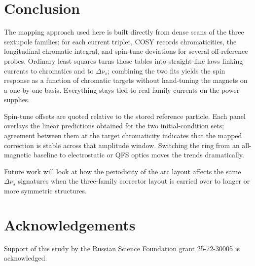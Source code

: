 \documentclass[%
               ]{jacow}
\begin{document}
\section{Conclusion}
\par The mapping approach used here is built directly from dense scans of the three sextupole families: for each current triplet, COSY records chromaticities, the longitudinal chromatic integral, and spin-tune deviations for several off-reference probes. Ordinary least squares turns those tables into straight-line laws linking currents to chromatics and to \(\Delta\nu_s\); combining the two fits yields the spin response as a function of chromatic targets without hand-tuning the magnets on a one-by-one basis. Everything stays tied to real family currents on the power supplies.

\par Spin-tune offsets are quoted relative to the stored reference particle. Each panel overlays the linear predictions obtained for the two initial-condition sets; agreement between them at the target chromaticity indicates that the mapped correction is stable across that amplitude window. Switching the ring from an all-magnetic baseline to electrostatic or QFS optics moves the trends dramatically.

\par Future work will look at how the periodicity of the arc layout affects the same \(\Delta\nu_s\) signatures when the three-family corrector layout is carried over to longer or more symmetric structures.

\section{Acknowledgements}

\par Support of this study by the Russian Science Foundation grant 25-72-30005 is acknowledged.
\end{document}
